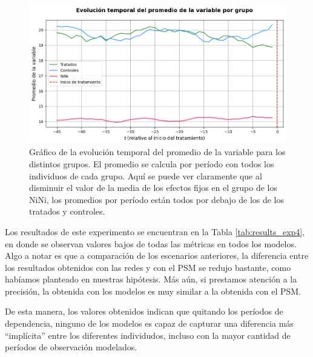 \documentclass[../../main.tex]{subfiles}
\begin{document}
\begin{figure}[H]
    \centering
    \includegraphics[scale=0.275]{figs/Exp4/promedios_sim13.png}
    \caption{Gráfico de la evolución temporal del promedio de la variable para los
    distintos grupos. El promedio se calcula por período con todos los individuos de cada
    grupo. Aquí se puede ver claramente que al disminuir el valor de la media de los
    efectos fijos en el grupo de los NiNi, los promedios por período están todos por
    debajo de los de los tratados y controles.}
    \label{fig:mean_time_series_exp4}
\end{figure}

Los resultados de este experimento se encuentran en la Tabla \ref{tab:results_exp4}, en
donde se observan valores bajos de todas las métricas en todos los modelos. Algo a notar
es que a comparación de los escenarios anteriores, la diferencia entre los resultados
obtenidos con las redes y con el PSM se redujo bastante, como habíamos planteado en
nuestras hipótesis. Más aún, si prestamos atención a la precisión, la obtenida con los
modelos es muy similar a la obtenida con el PSM.

De esta manera, los valores obtenidos indican que quitando los períodos de dependencia,
ninguno de los modelos es capaz de capturar una diferencia más ``implícita'' entre los
diferentes individudos, incluso con la mayor cantidad de períodos de observación
modelados.
\end{document}
